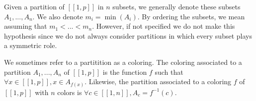 Given a partition of \([\![1, p]\!]\) in \(n\) subsets, we generally denote these subsets \(A_1, ..., A_n\). We also denote
\(m_i = \min(A_i)\). By ordering the subsets, we mean assuming that \(m_1 < ... < m_n\). However, if not specified we do 
not make this hypothesis since we do not always consider partitions in which every subset plays a symmetric role.

\begin{definition}
We sometimes refer to a partitition as a coloring. The coloring associated to a partition \(A_1, ..., A_n\) of
\([\![1, p]\!]\) is the function \(f\) such that \(\forall x \in [\![1, p]\!], x \in A_{f(x)}\). Likewise, the partition associated to
a coloring \(f\) of \([\![1, p]\!]\) with \(n\) colors is \(\forall c \in [\![1, n]\!], A_c = f^{-1}(c)\).
\end{definition}
